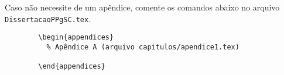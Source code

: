 Caso não necessite de um apêndice, comente os comandos abaixo no arquivo \texttt{DissertacaoPPgSC.tex}.

\begin{listing}[ht]
	\begin{verbatim}
		\begin{appendices}
		  % Apêndice A (arquivo capitulos/apendice1.tex)
		  
		\end{appendices}
	\end{verbatim}
	\caption{Exemplo de código \LaTeX{} usado para carregar um arquivo de apêndice.}
	\label{cod:appendix}
\end{listing}